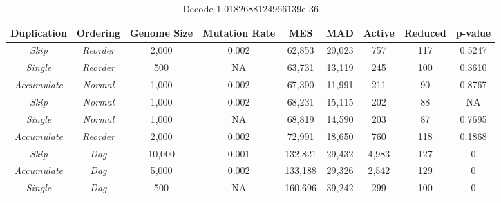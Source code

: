 \documentclass[journal]{IEEEtran}
\begin{document}
\begin{table*}
	\centering
	\begin{tabular}{|c|c|c|c|c|c|c|c|c|}
	  \hline
\textbf{Duplication} & \textbf{Ordering} & \textbf{Genome Size} & \textbf{Mutation Rate} & \textbf{MES} & \textbf{MAD} & \textbf{Active} & \textbf{Reduced} & \textbf{p-value} \\ \hline
\emph{Skip} & \emph{Reorder}       &  2,000 & 0.002 &  62,853 & 20,023 &   757 & 117 & 0.5247 \\ \hline
\emph{Single} & \emph{Reorder}     &    500 &    NA &  63,731 & 13,119 &   245 & 100 & 0.3610 \\ \hline
\emph{Accumulate} & \emph{Normal}  &  1,000 & 0.002 &  67,390 & 11,991 &   211 &  90 & 0.8767 \\ \hline
\rowcolor{Gray}
\emph{Skip} & \emph{Normal}        &  1,000 & 0.002 &  68,231 & 15,115 &   202 &  88 & NA \\ \hline
\emph{Single} & \emph{Normal}      &  1,000 &    NA &  68,819 & 14,590 &   203 &  87 & 0.7695 \\ \hline
\emph{Accumulate} & \emph{Reorder} &  2,000 & 0.002 &  72,991 & 18,650 &   760 & 118 & 0.1868 \\ \hline
\emph{Skip} & \emph{Dag}           & 10,000 & 0.001 & 132,821 & 29,432 & 4,983 & 127 & 0 \\ \hline
\emph{Accumulate} & \emph{Dag}     &  5,000 & 0.002 & 133,188 & 29,326 & 2,542 & 129 & 0 \\ \hline
\emph{Single} & \emph{Dag}         &    500 &    NA & 160,696 & 39,242 &   299 & 100 & 0 \\ \hline
	\end{tabular}
	\caption{Decode 1.0182688124966139e-36}
	\label{tab:decode}
\end{table*}
\end{document}

